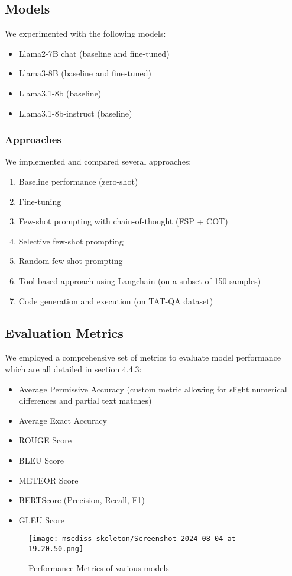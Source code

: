 \documentclass[logo,msc]{infthesis}           %
\begin{document}
\subsection{Models}

We experimented with the following models:
\begin{itemize}
\item Llama2-7B chat (baseline and fine-tuned)
\item Llama3-8B (baseline and fine-tuned)
\item Llama3.1-8b (baseline) 
\item Llama3.1-8b-instruct (baseline)
\end{itemize}

\subsubsection{Approaches}

We implemented and compared several approaches:

\begin{enumerate}
  \item Baseline performance (zero-shot)
  \item Fine-tuning
  \item Few-shot prompting with chain-of-thought (FSP + COT)
  \item Selective few-shot prompting
  \item Random few-shot prompting
  \item Tool-based approach using Langchain (on a subset of 150 samples)
   \item Code generation and execution (on TAT-QA dataset)
\end{enumerate}

\subsection{Evaluation Metrics}
We employed a comprehensive set of metrics to evaluate model performance which are all detailed in section 4.4.3:
\begin{itemize}
\item Average Permissive Accuracy (custom metric allowing for slight numerical differences and partial text matches)
\item Average Exact Accuracy
\item ROUGE Score
\item BLEU Score
\item METEOR Score
\item BERTScore (Precision, Recall, F1)
\item GLEU Score
\end{itemize}
\begin{figure}[h!] 
    \centering 
    \texttt{[image: mscdiss-skeleton/Screenshot 2024-08-04 at 19.20.50.png]} 
    \caption{Performance Metrics of various models} 
    \label{fig:my_label} 
\end{figure}
\end{document}
